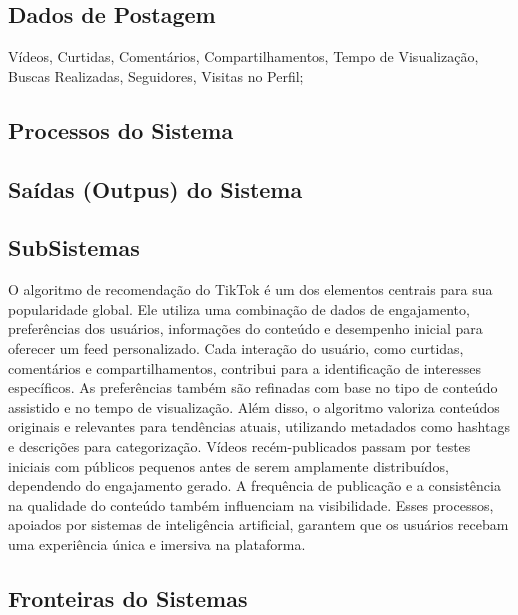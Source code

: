 \subsection{Dados de Postagem}

Vídeos, Curtidas, Comentários, Compartilhamentos, Tempo de Visualização, Buscas Realizadas, Seguidores, Visitas no Perfil; 















\newpage
\subsection{Processos do Sistema}

\newpage
\subsection{Saídas (Outpus) do Sistema}


\newpage
\subsection{SubSistemas}

O algoritmo de recomendação do TikTok é um dos elementos centrais para sua popularidade global. Ele utiliza uma combinação de dados de engajamento, preferências dos usuários, informações do conteúdo e desempenho inicial para oferecer um feed personalizado. Cada interação do usuário, como curtidas, comentários e compartilhamentos, contribui para a identificação de interesses específicos. As preferências também são refinadas com base no tipo de conteúdo assistido e no tempo de visualização. Além disso, o algoritmo valoriza conteúdos originais e relevantes para tendências atuais, utilizando metadados como hashtags e descrições para categorização. Vídeos recém-publicados passam por testes iniciais com públicos pequenos antes de serem amplamente distribuídos, dependendo do engajamento gerado. A frequência de publicação e a consistência na qualidade do conteúdo também influenciam na visibilidade. Esses processos, apoiados por sistemas de inteligência artificial, garantem que os usuários recebam uma experiência única e imersiva na plataforma.

\newpage
\subsection{Fronteiras do Sistemas}

